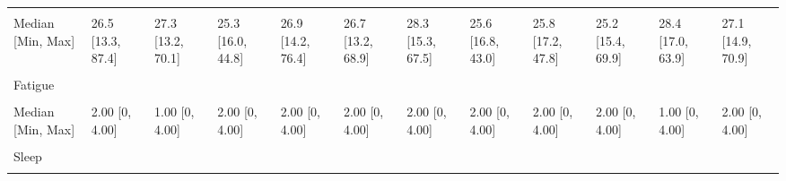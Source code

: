 \documentclass[
  single column]{article}
\begin{document}
\begin{landscape}
\begin{longtable}[t]{llllllllllll}
\cellcolor{gray!10}{Mean (SD)} & \cellcolor{gray!10}{27.6 (6.11)} & \cellcolor{gray!10}{28.4 (6.14)} & \cellcolor{gray!10}{26.1 (5.18)} & \cellcolor{gray!10}{28.0 (6.34)} & \cellcolor{gray!10}{27.8 (6.20)} & \cellcolor{gray!10}{29.6 (7.27)} & \cellcolor{gray!10}{26.5 (4.81)} & \cellcolor{gray!10}{27.6 (6.63)} & \cellcolor{gray!10}{26.3 (5.85)} & \cellcolor{gray!10}{29.8 (6.79)} & \cellcolor{gray!10}{28.3 (6.86)}\\
Median [Min, Max] & 26.5 [13.3, 87.4] & 27.3 [13.2, 70.1] & 25.3 [16.0, 44.8] & 26.9 [14.2, 76.4] & 26.7 [13.2, 68.9] & 28.3 [15.3, 67.5] & 25.6 [16.8, 43.0] & 25.8 [17.2, 47.8] & 25.2 [15.4, 69.9] & 28.4 [17.0, 63.9] & 27.1 [14.9, 70.9]\\
\addlinespace
\cellcolor{gray!10}{Missing} & \cellcolor{gray!10}{347 (1.6\%)} & \cellcolor{gray!10}{16 (1.2\%)} & \cellcolor{gray!10}{2 (0.7\%)} & \cellcolor{gray!10}{32 (1.6\%)} & \cellcolor{gray!10}{61 (1.7\%)} & \cellcolor{gray!10}{20 (1.8\%)} & \cellcolor{gray!10}{2 (1.5\%)} & \cellcolor{gray!10}{1 (1.1\%)} & \cellcolor{gray!10}{92 (14.0\%)} & \cellcolor{gray!10}{9 (1.6\%)} & \cellcolor{gray!10}{19 (2.6\%)}\\
Fatigue &  &  &  &  &  &  &  &  &  &  & \\
\cellcolor{gray!10}{Mean (SD)} & \cellcolor{gray!10}{1.75 (1.12)} & \cellcolor{gray!10}{1.47 (1.06)} & \cellcolor{gray!10}{1.73 (1.13)} & \cellcolor{gray!10}{1.67 (1.09)} & \cellcolor{gray!10}{1.72 (1.09)} & \cellcolor{gray!10}{1.67 (1.10)} & \cellcolor{gray!10}{1.62 (1.05)} & \cellcolor{gray!10}{1.80 (1.10)} & \cellcolor{gray!10}{2.02 (1.14)} & \cellcolor{gray!10}{1.53 (1.08)} & \cellcolor{gray!10}{1.90 (1.24)}\\
Median [Min, Max] & 2.00 [0, 4.00] & 1.00 [0, 4.00] & 2.00 [0, 4.00] & 2.00 [0, 4.00] & 2.00 [0, 4.00] & 2.00 [0, 4.00] & 2.00 [0, 4.00] & 2.00 [0, 4.00] & 2.00 [0, 4.00] & 1.00 [0, 4.00] & 2.00 [0, 4.00]\\
\cellcolor{gray!10}{Missing} & \cellcolor{gray!10}{106 (0.5\%)} & \cellcolor{gray!10}{7 (0.5\%)} & \cellcolor{gray!10}{0 (0\%)} & \cellcolor{gray!10}{13 (0.6\%)} & \cellcolor{gray!10}{18 (0.5\%)} & \cellcolor{gray!10}{2 (0.2\%)} & \cellcolor{gray!10}{0 (0\%)} & \cellcolor{gray!10}{1 (1.1\%)} & \cellcolor{gray!10}{6 (0.9\%)} & \cellcolor{gray!10}{4 (0.7\%)} & \cellcolor{gray!10}{8 (1.1\%)}\\
\addlinespace
Sleep &  &  &  &  &  &  &  &  &  &  & \\
\cellcolor{gray!10}{Mean (SD)} & \cellcolor{gray!10}{6.96 (1.12)} & \cellcolor{gray!10}{6.95 (1.11)} & \cellcolor{gray!10}{7.00 (1.10)} & \cellcolor{gray!10}{6.88 (1.17)} & \cellcolor{gray!10}{6.97 (1.11)} & \cellcolor{gray!10}{6.86 (1.23)} & \cellcolor{gray!10}{6.88 (1.20)} & \cellcolor{gray!10}{6.77 (1.25)} & \cellcolor{gray!10}{6.66 (1.25)} & \cellcolor{gray!10}{6.86 (1.17)} & \cellcolor{gray!10}{6.73 (1.33)}\\

\end{longtable}
\end{landscape}
\end{document}
